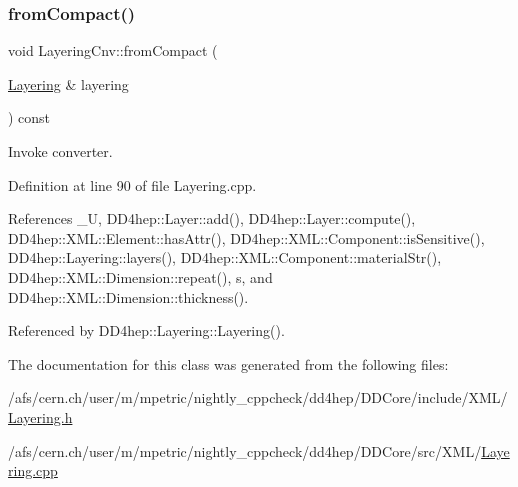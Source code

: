 \subsubsection{\texorpdfstring{from\+Compact()}{fromCompact()}}
{\footnotesize\ttfamily void Layering\+Cnv\+::from\+Compact (\begin{DoxyParamCaption}\item[{\hyperlink{class_d_d4hep_1_1_layering}{Layering} \&}]{layering }\end{DoxyParamCaption}) const}



Invoke converter. 



Definition at line 90 of file Layering.\+cpp.



References \+\_\+U, D\+D4hep\+::\+Layer\+::add(), D\+D4hep\+::\+Layer\+::compute(), D\+D4hep\+::\+X\+M\+L\+::\+Element\+::has\+Attr(), D\+D4hep\+::\+X\+M\+L\+::\+Component\+::is\+Sensitive(), D\+D4hep\+::\+Layering\+::layers(), D\+D4hep\+::\+X\+M\+L\+::\+Component\+::material\+Str(), D\+D4hep\+::\+X\+M\+L\+::\+Dimension\+::repeat(), s, and D\+D4hep\+::\+X\+M\+L\+::\+Dimension\+::thickness().



Referenced by D\+D4hep\+::\+Layering\+::\+Layering().



The documentation for this class was generated from the following files\+:\begin{DoxyCompactItemize}
\item 
/afs/cern.\+ch/user/m/mpetric/nightly\+\_\+cppcheck/dd4hep/\+D\+D\+Core/include/\+X\+M\+L/\hyperlink{_layering_8h}{Layering.\+h}\item 
/afs/cern.\+ch/user/m/mpetric/nightly\+\_\+cppcheck/dd4hep/\+D\+D\+Core/src/\+X\+M\+L/\hyperlink{_layering_8cpp}{Layering.\+cpp}\end{DoxyCompactItemize}
